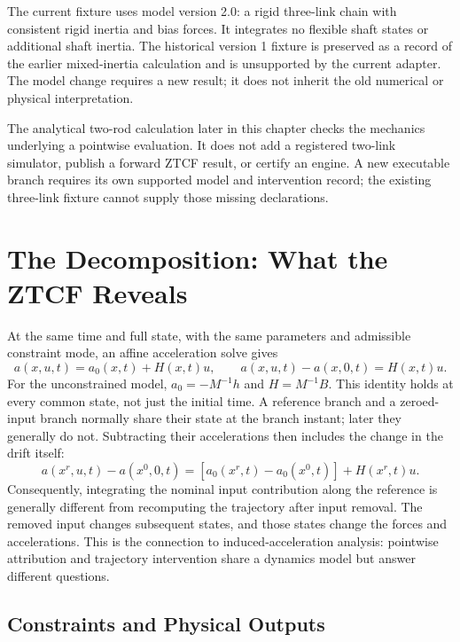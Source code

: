 The current fixture uses model version 2.0: a rigid three-link chain with consistent rigid inertia and bias forces. It integrates no flexible shaft states or additional shaft inertia. The historical version 1 fixture is preserved as a record of the earlier mixed-inertia calculation and is unsupported by the current adapter. The model change requires a new result; it does not inherit the old numerical or physical interpretation.

The analytical two-rod calculation later in this chapter checks the mechanics underlying a pointwise evaluation. It does not add a registered two-link simulator, publish a forward ZTCF result, or certify an engine. A new executable branch requires its own supported model and intervention record; the existing three-link fixture cannot supply those missing declarations.

\section{The Decomposition: What the ZTCF Reveals}
\label{sec:ztcf_decomposition}

At the same time and full state, with the same parameters and admissible constraint mode, an affine acceleration solve gives
\begin{equation}
a(x,u,t)=a_0(x,t)+H(x,t)u,
\qquad a(x,u,t)-a(x,0,t)=H(x,t)u.
\label{eq:torque_decomposition}
\end{equation}
For the unconstrained model, $a_0=-M^{-1}h$ and $H=M^{-1}B$. This identity holds at every common state, not just the initial time. A reference branch and a zeroed-input branch normally share their state at the branch instant; later they generally do not. Subtracting their accelerations then includes the change in the drift itself:
\begin{equation}
a(x^r,u,t)-a(x^0,0,t)
=[a_0(x^r,t)-a_0(x^0,t)]+H(x^r,t)u.
\end{equation}
Consequently, integrating the nominal input contribution along the reference is generally different from recomputing the trajectory after input removal. The removed input changes subsequent states, and those states change the forces and accelerations. This is the connection to induced-acceleration analysis: pointwise attribution and trajectory intervention share a dynamics model but answer different questions.

\subsection{Constraints and Physical Outputs}

